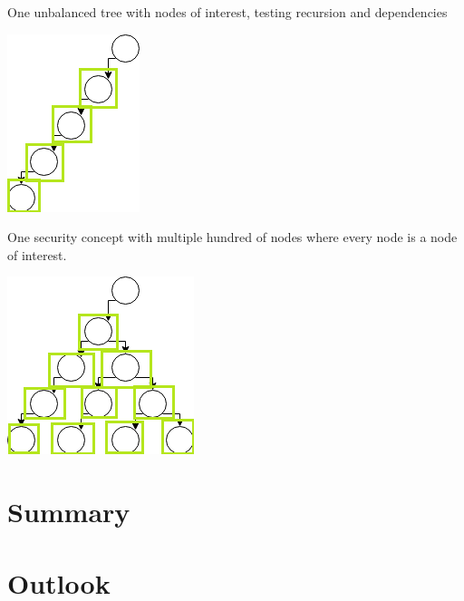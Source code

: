 One unbalanced tree with nodes of interest, testing recursion and dependencies

\includegraphics[scale=1]{pictures/unbalanced}

One security concept with multiple hundred of nodes where every node is a node of interest. 

\includegraphics[scale=1]{pictures/many_nodes}

\section{Summary}

\section{Outlook}

\label{subsec:secgoal}